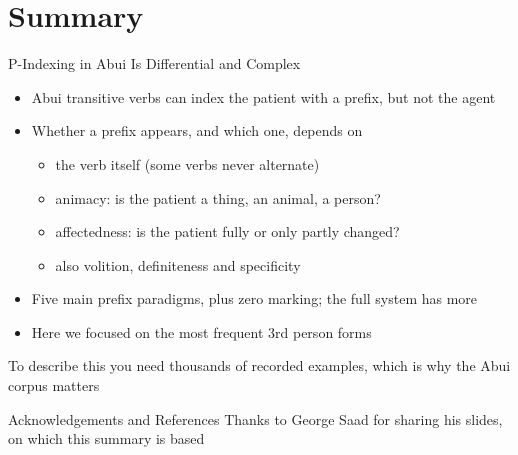 \documentclass{beamer}
\begin{document}
\section{Summary}

\begin{frame}{P-Indexing in Abui Is Differential and Complex}
  \begin{itemize}
  \item Abui transitive verbs can index the patient with a prefix, but not the agent
  \item Whether a prefix appears, and which one, depends on
    \begin{itemize}
    \item the verb itself (some verbs never alternate)
    \item animacy: is the patient a thing, an animal, a person?
    \item affectedness: is the patient fully or only partly changed?
    \item also volition, definiteness and specificity \citep{kratochvil:2011,kratochvil:2014}
    \end{itemize}
  \item Five main prefix paradigms, plus zero marking; the full system has more
  \item Here we focused on the most frequent 3rd person forms
  \end{itemize}
  \vfill
  \large
  To describe this you need thousands of recorded examples, which is why
  the Abui corpus matters
\end{frame}

\begin{frame}[allowframebreaks]{Acknowledgements and References}
  Thanks to George Saad for sharing his slides, on which this summary is based
  \vfill
  \small
  
  
\end{frame}
\end{document}
